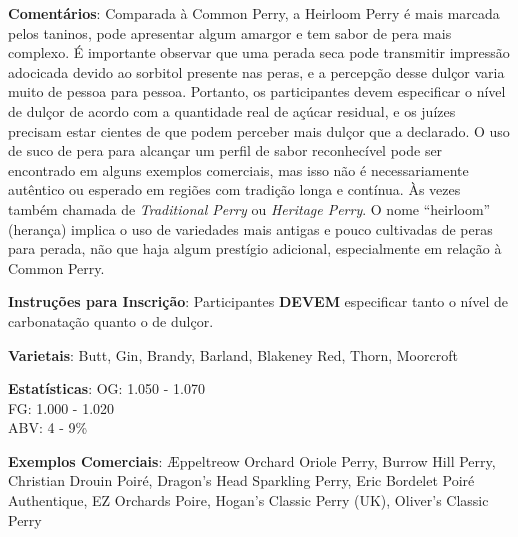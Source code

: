 \textbf{Comentários}: Comparada à Common Perry, a Heirloom Perry é mais marcada pelos taninos, pode apresentar algum amargor e tem sabor de pera mais complexo. É importante observar que uma perada seca pode transmitir impressão adocicada devido ao sorbitol presente nas peras, e a percepção desse dulçor varia muito de pessoa para pessoa. Portanto, os participantes devem especificar o nível de dulçor de acordo com a quantidade real de açúcar residual, e os juízes precisam estar cientes de que podem perceber mais dulçor que a declarado. O uso de suco  de pera para alcançar um perfil de sabor reconhecível pode ser encontrado em alguns exemplos comerciais, mas isso não é necessariamente autêntico ou esperado em regiões com tradição longa e contínua. Às vezes também chamada de \textit{Traditional Perry} ou \textit{Heritage Perry}. O nome “heirloom” (herança) implica o uso de variedades mais antigas e pouco cultivadas de peras para perada, não que haja algum prestígio adicional, especialmente em relação à Common Perry.

\textbf{Instruções para Inscrição}: Participantes \textbf{DEVEM} especificar tanto o nível de carbonatação quanto o de dulçor.

\textbf{Varietais}: Butt, Gin, Brandy, Barland, Blakeney Red, Thorn, Moorcroft

\textbf{Estatísticas}: OG: 1.050 - 1.070 \\
\phantom{ } \hspace{16.5mm} FG: 1.000 - 1.020 \\
\phantom{ } \hspace{16.5mm} ABV: 4 - 9\%

\textbf{Exemplos Comerciais}: Æppeltreow Orchard Oriole Perry, Burrow Hill Perry, Christian Drouin Poiré, Dragon's Head Sparkling Perry, Eric Bordelet Poiré Authentique, EZ Orchards Poire, Hogan's Classic Perry (UK), Oliver's Classic Perry
